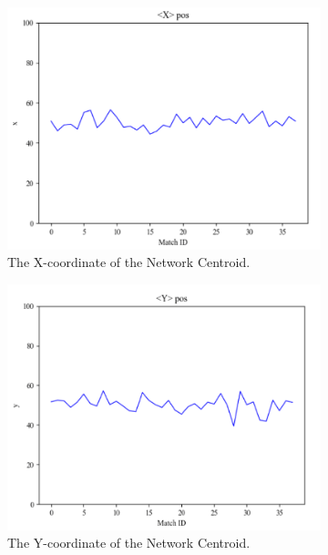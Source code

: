 \documentclass{mcmthesis}
\begin{document}
	\begin{figure}[h]
		\centering
		\begin{subfigure}[b]{0.5\textwidth}
			\includegraphics[width=\textwidth]{figures/xc2.png}
			\caption{The X-coordinate of the Network Centroid.}
			\label{fig:x2}
		\end{subfigure}%
		\begin{subfigure}[b]{0.5\textwidth}
			\includegraphics[width=\textwidth]{figures/yc2.png}
			\caption{The Y-coordinate of the Network Centroid.}
			\label{fig:y2}
		\end{subfigure}
		\begin{subfigure}[b]{0.5\textwidth}

\end{subfigure}
\end{figure}
\end{document}

